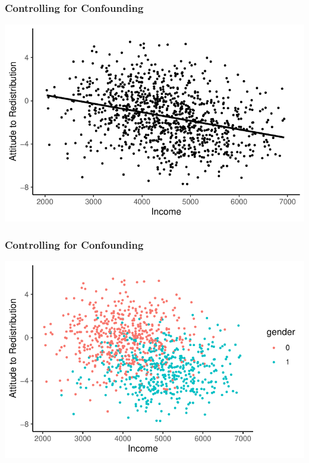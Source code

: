 \documentclass[xcolor=x11names,compress]{beamer}\usepackage[]{graphicx}\usepackage[]{color}
\makeatletter
\def\maxwidth{ %
  \ifdim\Gin@nat@width>\linewidth
    \linewidth
  \else
    \Gin@nat@width
  \fi
}
\newenvironment{knitrout}{}{} %
\renewcommand{\(}{\begin{columns}}
\renewcommand{\)}{\end{columns}}
\newcommand{\<}[1]{\begin{column}{#1}}
\renewcommand{\>}{\end{column}}
\makeatother
\begin{document}
\begin{frame}
\frametitle{Controlling for Confounding}
\begin{knitrout}
\color{fgcolor}
\includegraphics[width=\maxwidth]{figure/confound0a-1} 

\end{knitrout}
\end{frame}

\begin{frame}
\frametitle{Controlling for Confounding}
\begin{knitrout}
\color{fgcolor}
\includegraphics[width=\maxwidth]{figure/confound0b-1} 

\end{knitrout}
\end{frame}
\end{document}
